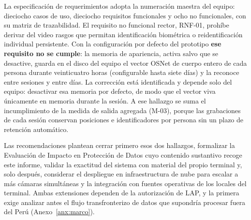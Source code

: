 La especificación de requerimientos adopta la numeración maestra del equipo: dieciocho casos
de uso, dieciocho requisitos funcionales y ocho no funcionales, con su matriz de trazabilidad.
El requisito no funcional rector, RNF-01, prohíbe derivar del video rasgos que permitan
identificación biométrica o reidentificación individual persistente. Con la configuración por
defecto del prototipo \textbf{ese requisito no se cumple}: la memoria de apariencia, activa salvo
que se desactive, guarda en el disco del equipo el vector OSNet de cuerpo entero de cada
persona durante veinticuatro horas (configurable hasta siete días) y la reconoce entre sesiones y
entre días. La corrección está identificada y depende solo del equipo: desactivar esa memoria
por defecto, de modo que el vector viva únicamente en memoria durante la sesión. A ese
hallazgo se suma el incumplimiento de la medida de salida agregada (M-03), porque las
grabaciones de cada sesión conservan posiciones e identificadores por persona sin un plazo de
retención automático.

Las recomendaciones plantean cerrar primero esos dos hallazgos, formalizar la Evaluación de
Impacto en Protección de Datos cuyo contenido sustantivo recoge este informe, validar la
exactitud del sistema con material del propio terminal y, solo después, considerar el despliegue
en infraestructura de nube para escalar a más cámaras simultáneas y la integración con fuentes
operativas de los locales del terminal. Ambas extensiones dependen de la autorización de LAP,
y la primera exige analizar antes el flujo transfronterizo de datos que supondría procesar fuera
del Perú (Anexo~\ref{anx:marco}).

